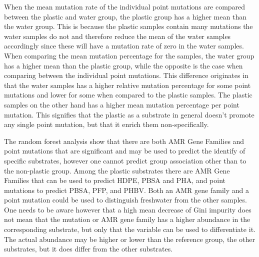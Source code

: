 When the mean mutation rate of the individual point mutations are compared between the plastic and water group, the plastic group has a higher mean than the water group. 
This is because the plastic samples contain many mutations the water samples do not
and therefore reduce the mean of the water samples accordingly since these will have a mutation rate of zero in the water samples.
When comparing the mean mutation percentage for the samples, the water group has a higher mean than the plastic group, while the opposite is the case when comparing between the individual point mutations. 
This difference originates in that the water samples has a higher relative mutation percentage for some point mutations and lower for some when compared to the plastic samples. 
The plastic samples on the other hand has a higher mean mutation percentage per point mutation. 
This signifies that the plastic as a substrate in general doesn't promote any single point mutation, but that it enrich  them non-specifically.


The random forest analysis show that there are both AMR Gene Families and point mutations that are significant and may be used to predict the identify of specific substrates, however one cannot predict group association other than to the non-plastic group.
Among the plastic substrates there are AMR Gene Families that can be used to predict HDPE, PBSA and PHA, and point mutations to predict PBSA, PFP, and PHBV.
Both an AMR gene family and a point mutation could be used to distinguish freshwater from the other samples.
One needs to be aware however that a high mean decrease of Gini impurity does not mean that the mutation or AMR gene family has a higher abundance in the corresponding substrate, but only that the variable can be used to differentiate it. The actual abundance may be higher or lower than the reference group, the other substrates, but it does differ from the other substrates. 

